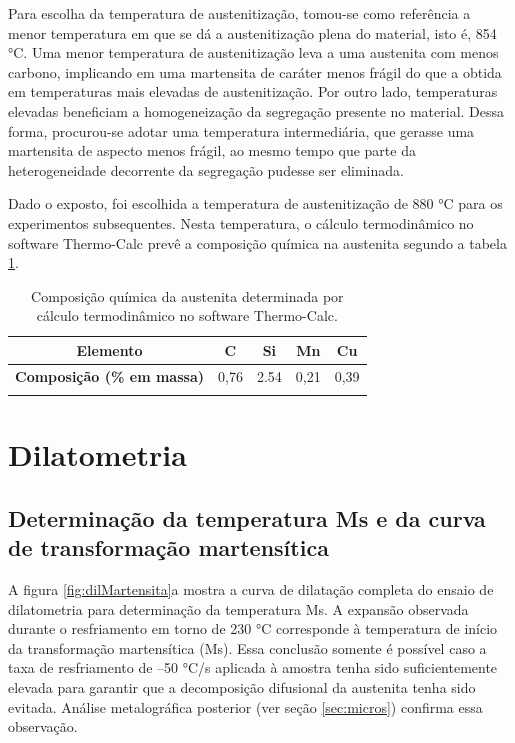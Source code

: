 Para escolha da temperatura de austenitização, tomou-se como referência a menor temperatura em que se dá a austenitização plena do material, isto é, 854 °C. Uma menor temperatura de austenitização leva a uma austenita com menos carbono, implicando em uma martensita de caráter menos frágil do que a obtida em temperaturas mais elevadas de austenitização. Por outro lado, temperaturas elevadas beneficiam a homogeneização da segregação presente no material. Dessa forma, procurou-se adotar uma temperatura intermediária, que gerasse uma martensita de aspecto menos frágil, ao mesmo tempo que parte da heterogeneidade decorrente da segregação pudesse ser eliminada.

Dado o exposto, foi escolhida a temperatura de austenitização de 880 °C para os experimentos subsequentes. Nesta temperatura, o cálculo termodinâmico no software Thermo-Calc\textregistered{} prevê a composição química na austenita segundo a tabela \ref{tab:CQaust}.

\begin{table}
	\caption{Composição química da austenita determinada por cálculo termodinâmico no software Thermo-Calc\textregistered{}.}
	\begin{tabular}{c c c c c}
	\thickhline
	\textbf{Elemento} & C & Si & Mn & Cu\\
	\hline
	\textbf{Composição (\% em massa)} & 0,76 & 2.54 & 0,21 & 0,39\\
	\thickhline
	\end{tabular}
	\label{tab:CQaust}
\end{table}

\section{Dilatometria}

\subsection{Determina\c{c}\~{a}o da temperatura Ms e da curva de transformação martensítica}

A figura \ref{fig:dilMartensita}a mostra a curva de dilatação completa do ensaio de dilatometria para determinação da temperatura Ms. A expansão observada durante o resfriamento em torno de 230 °C corresponde à temperatura de início da transformação martensítica (Ms). Essa conclusão somente é possível caso a taxa de resfriamento de --50 °C/s aplicada à amostra tenha sido suficientemente elevada para garantir que a decomposição difusional da austenita tenha sido evitada. Análise metalográfica posterior (ver seção \ref{sec:micros}) confirma essa observação.

